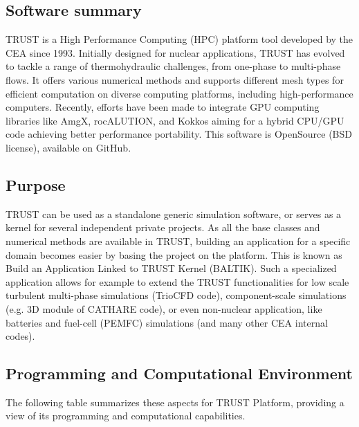 \subsection{Software summary}
\label{sec:TRUST Platform:summary}

TRUST is a High Performance Computing (HPC) platform tool developed by the CEA since 1993. Initially designed for nuclear applications, TRUST has evolved to tackle a range of thermohydraulic challenges, from one-phase to multi-phase flows. It offers various numerical methods and supports different mesh types for efficient computation on diverse computing platforms, including high-performance computers. Recently, efforts have been made to integrate GPU computing libraries like AmgX, rocALUTION, and Kokkos aiming for a hybrid CPU/GPU code achieving better performance portability. This software is OpenSource (BSD license), available on GitHub.

\subsection{Purpose}
\label{sec:TRUST Platform:purpose}

TRUST can be used as a standalone generic simulation software, or serves as a kernel for several independent private projects. As all the base classes and numerical methods are available in TRUST, building an application for a specific domain becomes easier by basing the project on the platform. This is known as Build an Application Linked to TRUST Kernel (BALTIK). Such a specialized application allows for example to extend the TRUST functionalities for low scale turbulent multi-phase simulations (TrioCFD code), component-scale simulations (e.g. 3D module of CATHARE code), or even non-nuclear application, like batteries and fuel-cell (PEMFC) simulations (and many other CEA internal codes).

\subsection{Programming and Computational Environment}
\label{sec::TRUST Platform:environment_capabilities}


The following table summarizes these aspects for TRUST Platform, providing a  view of its programming and computational capabilities.

